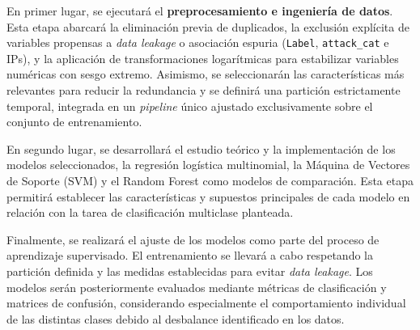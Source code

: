 \documentclass[conference]{IEEEtran}
\begin{document}
En primer lugar, se ejecutará el \textbf{preprocesamiento e ingeniería de datos}. Esta etapa abarcará la eliminación previa de duplicados, la exclusión explícita de variables propensas a \emph{data leakage} o asociación espuria (\texttt{Label}, \texttt{attack\_cat} e IPs), y la aplicación de transformaciones logarítmicas para estabilizar variables numéricas con sesgo extremo. Asimismo, se seleccionarán las características más relevantes para reducir la redundancia y se definirá una partición estrictamente temporal, integrada en un \emph{pipeline} único ajustado exclusivamente sobre el conjunto de entrenamiento.

En segundo lugar, se desarrollará el estudio teórico y la implementación de los modelos seleccionados, la regresión logística multinomial, la Máquina de Vectores de Soporte (SVM) y el Random Forest como modelos de comparación. Esta etapa permitirá establecer las características y supuestos principales de cada modelo en relación con la tarea de clasificación multiclase planteada.

Finalmente, se realizará el ajuste de los modelos como parte del proceso de aprendizaje supervisado. El entrenamiento se llevará a cabo respetando la partición definida y las medidas establecidas para evitar \emph{data leakage}. Los modelos serán posteriormente evaluados mediante métricas de clasificación y matrices de confusión, considerando especialmente el comportamiento individual de las distintas clases debido al desbalance identificado en los datos.
\end{document}
